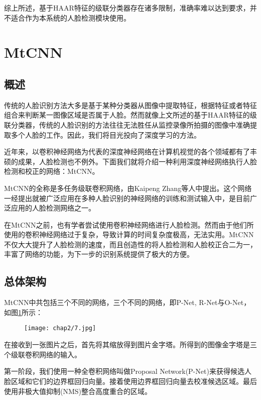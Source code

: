 综上所述，基于HAAR特征的级联分类器存在诸多限制，准确率难以达到要求，并不适合作为本系统的人脸检测模块使用。

\section{MtCNN}

\subsection{概述}

传统的人脸识别方法大多是基于某种分类器从图像中提取特征，根据特征或者特征组合来判断某一图像区域是否属于人脸。然而就像上文所述的基于HAAR特征的级联分类器，传统的人脸识别的方法往往无法胜任从监控录像所拍摄的图像中准确提取多个人脸的工作。因此，我们将目光投向了深度学习的方法。

近年来，以卷积神经网络为代表的深度神经网络在计算机视觉的各个领域都有了丰硕的成果，人脸检测也不例外。下面我们就将介绍一种利用深度神经网络执行人脸检测和校正的网络：MtCNN\cite{zhang2016joint}。

MtCNN的全称是多任务级联卷积网络，由Kaipeng Zhang等人中提出。这个网络一经提出就被广泛应用在多种人脸识别的神经网络的训练和测试输入中，是目前广泛应用的人脸检测网络之一。

在MtCNN之前，也有学者尝试使用卷积神经网络进行人脸检测。然而由于他们所使用的卷积神经网络过于复杂，导致计算的时间复杂度极高，无法实用\cite{yang2015facial}。MtCNN不仅大大提升了人脸检测的速度，而且创造性的将人脸检测和人脸校正合二为一，丰富了网络的功能，为下一步的识别系统提供了极大的方便。

\subsection{总体架构}

MtCNN中共包括三个不同的网络，三个不同的网络，即P-Net, R-Net与O-Net，如图\ref{fig:mtcnn}所示：

\begin{figure}[!htp]
	\centering
	\texttt{[image: chap2/7.jpg]}
	\label{fig:mtcnn}
\end{figure}

在接收到一张图片之后，首先将其缩放得到图片金字塔。所得到的图像金字塔是三个级联卷积网络的输入。

第一阶段，我们使用一种全卷积网络叫做Proposal Network(P-Net)来获得候选人脸区域和它们的边界框回归向量。接着使用边界框回归向量去校准候选区域。最后使用非极大值抑制(NMS)整合高度重合的区域。

